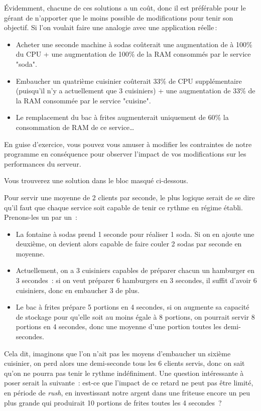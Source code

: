 \documentclass[small]{zmdocument}
\begin{document}
Évidemment, chacune de ces solutions a un coût, donc il est préférable pour le
gérant de n’apporter que le moins possible de modifications pour tenir son
objectif. Si l’on voulait faire une analogie avec une application réelle :



\begin{itemize}
\item\relax Acheter une seconde machine à sodas coûterait une augmentation de à 100\% du CPU + une augmentation de 100\% de la RAM consommés par le service "soda".
\item\relax Embaucher un quatrième cuisinier coûterait 33\% de CPU supplémentaire (puisqu’il n’y a actuellement que 3 cuisiniers) +
une augmentation de 33\% de la RAM consommée par le service "cuisine".
\item\relax Le remplacement du bac à frites augmenterait uniquement de 60\% la
consommation de RAM de ce service…
\end{itemize}


En guise d’exercice, vous pouvez vous amuser à modifier les contraintes de
notre programme en conséquence pour observer l’impact de vos modifications sur
les performances du serveur. 



Vous trouverez une solution dans le bloc masqué ci-dessous.



\begin{Spoiler}
Pour servir une moyenne de 2 clients par seconde, le plus logique serait de se dire qu’il faut que chaque service soit capable de tenir ce rythme en régime établi. Prenons-les un par un :

\begin{itemize}
\item\relax La fontaine à sodas prend 1 seconde pour réaliser 1 soda. Si on en ajoute une deuxième, on devient alors capable de faire couler 2 sodas par seconde en moyenne.
\item\relax Actuellement, on a 3 cuisiniers capables de préparer chacun un hamburger en 3 secondes : si on veut préparer 6 hamburgers en 3 secondes, il suffit d’avoir 6 cuisiniers, donc en embaucher 3 de plus.
\item\relax Le bac à frites prépare 5 portions en 4 secondes, si on augmente sa capacité de stockage pour qu’elle soit au moins égale à 8 portions, on pourrait servir 8 portions en 4 secondes, donc une moyenne d’une portion toutes les demi-secondes.
\end{itemize}
Cela dit, imaginons que l’on n’ait pas les moyens d’embaucher un sixième cuisinier, on perd alors une demi-seconde tous les 6 clients servis, donc on sait qu’on ne pourra pas tenir le rythme indéfiniment. Une question intéressante à poser serait la suivante : est-ce que l’impact de ce retard ne peut pas être limité, en période de \textit{rush}, en investissant notre argent dans une friteuse encore un peu plus grande qui produirait 10 portions de frites toutes les 4 secondes ?
\end{Spoiler}
\end{document}

